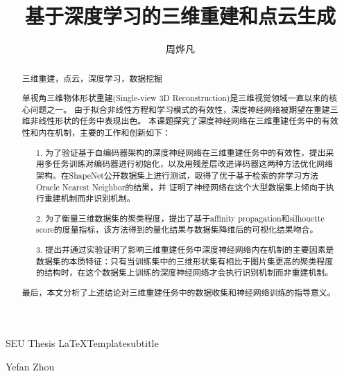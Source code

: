 \documentclass[bachelor, nocolorlinks, printoneside]{seuthesis} %
\begin{document}

\title{基于深度学习的三维重建和点云生成}{}{SEU Thesis \LaTeX Template}{subtitle}
\author{周烨凡}{Yefan Zhou}




\maketitle

\begin{abstract}{三维重建，点云，深度学习，数据挖掘}

    单视角三维物体形状重建(Single-view 3D Reconstruction)是三维视觉领域一直以来的核心问题之一。
    由于拟合非线性方程和学习模式的有效性，深度神经网络被期望在重建三维非线性形状的任务中表现出色。
    本课题探究了深度神经网络在三维重建任务中的有效性和内在机制，主要的工作和创新如下：
        
        \begin{enumerate}
            \item[1.] 为了验证基于自编码器架构的深度神经网络在三维重建任务中的有效性，提出采用多任务训练对编码器进行初始化，以及用残差层改进译码器这两种方法优化网络架构。在ShapeNet公开数据集上进行测试，取得了优于基于检索的非学习方法Oracle Nearest Neighbor的结果，并
            证明了神经网络在这个大型数据集上倾向于执行重建机制而非识别机制。 
            \item[2.] 为了衡量三维数据集的聚类程度，提出了基于affinity propagation和silhouette score的度量指标，该方法得到的量化结果与数据集降维后的可视化结果吻合。
            \item[3.] 提出并通过实验证明了影响三维重建任务中深度神经网络内在机制的主要因素是数据集的本质特征：只有当训练集中的三维形状集有相比于图片集更高的聚类程度的结构时，在这个数据集上训练的深度神经网络才会执行识别机制而非重建机制。
        \end{enumerate}
    最后，本文分析了上述结论对三维重建任务中的数据收集和神经网络训练的指导意义。
    \end{abstract}
\end{document}

